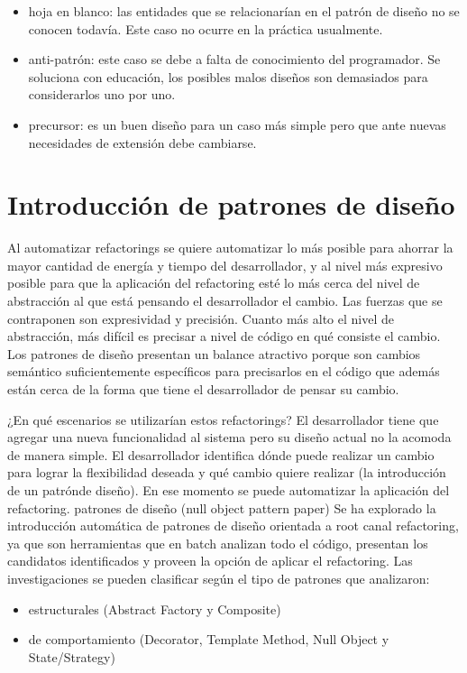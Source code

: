\begin{itemize}
    \item hoja en blanco: las entidades que se relacionarían en el patrón de diseño no se conocen
    todavía. Este caso no ocurre en la práctica usualmente.
    \item anti-patrón: este caso se debe a falta de conocimiento del programador. Se soluciona con
    educación, los posibles malos diseños son demasiados para considerarlos uno por uno.
    \item precursor: es un buen diseño para un caso más simple pero que ante nuevas necesidades de
    extensión debe cambiarse.
\end{itemize}

\section{Introducción de patrones de diseño}
Al automatizar refactorings se
quiere automatizar lo más posible para ahorrar la mayor cantidad de energía y tiempo del
desarrollador, y al nivel más expresivo posible para que la aplicación del refactoring esté lo más
cerca del nivel de abstracción al que está pensando el desarrollador el cambio. Las fuerzas que se
contraponen son expresividad y precisión. Cuanto más alto el nivel de abstracción, más difícil es
precisar a nivel de código en qué consiste el cambio. Los patrones de diseño presentan un balance
atractivo porque son cambios semántico suficientemente específicos para precisarlos en el código que
además están cerca de la forma que tiene el desarrollador de pensar su cambio.

¿En qué escenarios se utilizarían estos refactorings? El desarrollador tiene que agregar una nueva
funcionalidad al sistema pero su diseño actual no la acomoda de manera simple. El desarrollador
identifica dónde puede realizar un cambio para lograr la flexibilidad deseada y qué cambio quiere
realizar (la introducción de un patrónde diseño). En ese momento se puede automatizar la aplicación
del refactoring. patrones de diseño (null object pattern paper) Se ha explorado la introducción
automática de patrones de diseño orientada a root canal refactoring, ya que son herramientas que en
batch analizan todo el código, presentan los candidatos identificados y proveen la opción de aplicar
el refactoring. Las investigaciones se pueden clasificar según el tipo de patrones que analizaron:

\begin{itemize}
    \item estructurales (Abstract Factory y Composite)
    \item de comportamiento (Decorator, Template Method, Null Object y State/Strategy)
\end{itemize}

